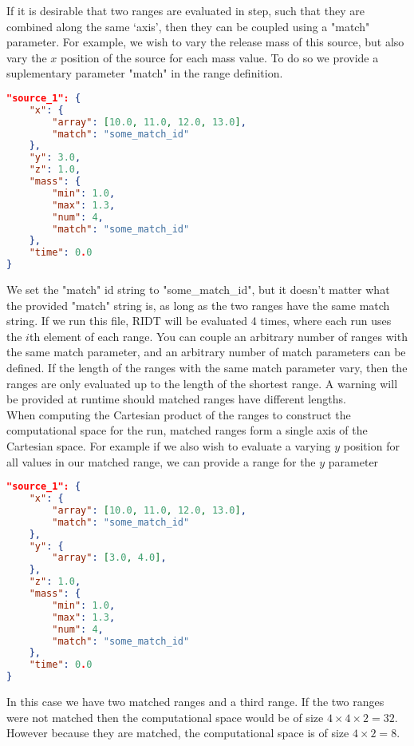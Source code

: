 \documentclass[]{article}
\begin{document}
\noindent If it is desirable that two ranges are evaluated in step, such that they are
combined along the same `axis', then they can be coupled using a "match"
parameter. For example, we wish to vary the release mass of this source, but
also vary the $x$ position of the source for each mass value. To do so we provide
a suplementary parameter "match" in the range definition.\\
\begin{lstlisting}[language=json,firstnumber=1]
"source_1": {
    "x": {
        "array": [10.0, 11.0, 12.0, 13.0],
        "match": "some_match_id"
    },
    "y": 3.0,
    "z": 1.0,
    "mass": {
        "min": 1.0,
        "max": 1.3,
        "num": 4,
        "match": "some_match_id"
    },
    "time": 0.0
}
\end{lstlisting}
\medskip
We set the "match" id string to "some\_match\_id", but it doesn't matter what the
provided "match" string is, as long as the two ranges have the same match
string. If we run this file, RIDT will be evaluated 4 times, where each run uses
the $i$th element of each range. You can couple an arbitrary number of ranges
with the same match parameter, and an arbitrary number of match parameters can
be defined. If the length of the ranges with the same match parameter vary, then
the ranges are only evaluated up to the length of the shortest range. A warning
will be provided at runtime should matched ranges have different lengths.\\

\noindent When computing the Cartesian product of the ranges to construct the
computational space for the run, matched ranges form a single axis of the
Cartesian space. For example if we also wish to evaluate a varying $y$ position
for all values in our matched range, we can provide a range for the $y$
parameter\\
\begin{lstlisting}[language=json,firstnumber=1]
"source_1": {
    "x": {
        "array": [10.0, 11.0, 12.0, 13.0],
        "match": "some_match_id"
    },
    "y": {
        "array": [3.0, 4.0],
    },
    "z": 1.0,
    "mass": {
        "min": 1.0,
        "max": 1.3,
        "num": 4,
        "match": "some_match_id"
    },
    "time": 0.0
}
\end{lstlisting}
\medskip
In this case we have two matched ranges and a third range. If the two ranges
were not matched then the computational space would be of size
$4\times4\times2=32$. However because they are matched, the computational space 
is of size $4\times2=8$.\\
\end{document}
